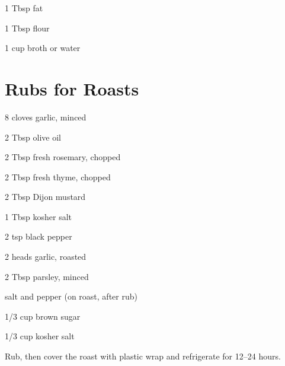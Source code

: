 \documentclass[oneside]{book}  %
\def\thisrecipe{}  %
\newcommand{\recipe}[1]{\section{#1}\def\thisrecipe{: #1}} %
\newcommand{\itemNL}{\item[] \hspace{-\labelsep}}  %
\begin{document}
\begin{twocols}
  \begin{ingredients}[Gravy]
    \item[1 Tbsp] fat
    \item[1 Tbsp] flour
    \item[1 cup] broth or water
  \end{ingredients}

\end{twocols}
\recipe{Rubs for Roasts} \label{recipe:rubs_for_roasts} %

\begin{twocols}
  \begin{ingredients}
    \item[8] cloves garlic, minced
    \item[2 Tbsp] olive oil
    \item[2 Tbsp] fresh rosemary, chopped
    \item[2 Tbsp] fresh thyme, chopped
    \item[2 Tbsp] Dijon mustard
    \item[1 Tbsp] kosher salt
    \item[2 tsp]  black pepper
  \end{ingredients}

  \columnbreak

  \begin{ingredients}
    \item[2 heads] garlic, roasted
    \item[2 Tbsp] parsley, minced
    \itemNL salt and pepper (on roast, after rub)
  \end{ingredients}

  \begin{ingredients}
    \item[1/3 cup] brown sugar
    \item[1/3 cup] kosher salt
  \end{ingredients}
  \vspace{-0.75em} Rub, then cover the roast with plastic wrap and refrigerate
  for 12--24 hours.

\end{twocols}

\backmatter
\def\thisrecipe{}  %
 \printindex
\end{document}
